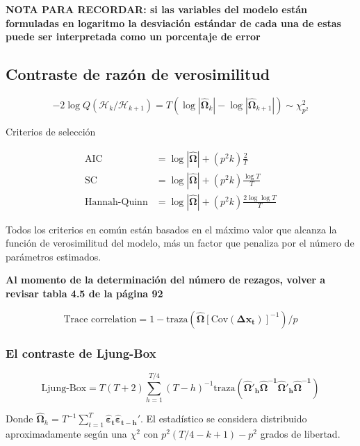 \documentclass[12pt, twoside]{book}\usepackage[]{graphicx}\usepackage[]{color}
\let\bold\boldsymbol
\numberwithin{equation}{section}
\numberwithin{theorem}{section}
\numberwithin{teorema}{section}
\numberwithin{defi}{section}
\numberwithin{prop}{section}
\numberwithin{defi}{section}
\theoremstyle{plain}
\begin{document}
{\textbf{NOTA PARA RECORDAR: si las variables del modelo están formuladas en logaritmo la desviación estándar de cada una de estas puede ser interpretada como un porcentaje de error }


\subsection{Contraste de razón de verosimilitud}

\begin{equation}
  -2\log Q(\mathcal{H}_{k}/\mathcal{H}_{k+1}) =  T(\log|\boldsymbol{\hat{\Omega}}_{k}|-\log|\boldsymbol{\hat{\Omega}}_{k+1}|) \sim \chi^{2}_{p^{2}}
\end{equation}


Criterios de selección 

\begin{align}
\text{AIC} & = \log |\boldsymbol{\hat{\Omega}}|+(p^{2}k)\frac{2}{T} \\ 
\text{SC} & = \log|\boldsymbol{\hat{\Omega}}|+(p^{2}k)\frac{\log T}{T} \\ 
\text{Hannah-Quinn} & = \log|\boldsymbol{\hat{\Omega}}|+(p^{2}k)\frac{2\log \log T}{T}
\end{align}

Todos los criterios en común están basados en el máximo valor que alcanza la función de verosimilitud del modelo, más un factor que penaliza por el número de parámetros estimados. 

\textbf{
Al momento de la determinación del número de rezagos, volver a revisar tabla 4.5 de la página 92}

\begin{equation}
\text{Trace correlation} = 1-\text{traza}(\boldsymbol{\hat{\Omega}}[\text{Cov}(\bold{\Delta x_{t}})]^{-1})/p 
\end{equation}


\subsubsection{El contraste de Ljung-Box}

\begin{equation}
\text{Ljung-Box} = T(T+2)\sum_{h=1}^{T/4}(T-h)^{-1}\text{traza}(\boldsymbol{\hat{\Omega}'_{h}\hat{\Omega}^{-1}\hat{\Omega}'_{h}\hat{\Omega}^{-1}})
\end{equation}

Donde  $ \boldsymbol{\hat{\Omega}}_{h} = T^{-1}\sum_{t=1}^{T}\boldsymbol{\hat{\varepsilon}_{t}\hat{\varepsilon}_{t-h}'}$. El estadístico se considera distribuido aproximadamente según una $\chi^{2}$ con $p^{2}(T/4-k+1)-p^{2}$ grados de libertad. 

}
\end{document}
